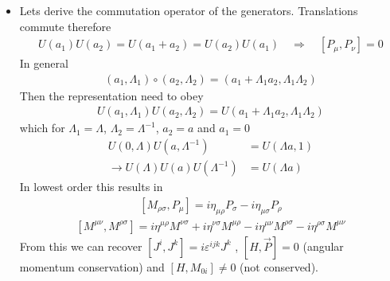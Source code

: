 \documentclass[10pt,a4paper]{article}
\theoremstyle{definition}
\begin{document}
\begin{itemize}
\item Lets derive the commutation operator of the generators. Translations commute therefore
\begin{align}
U(a_1)U(a_2)=U(a_1+a_2)=U(a_2)U(a_1)\quad\Rightarrow\quad
\boxed{[P_\mu,P_\nu]=0}
\end{align}
In general
\begin{align}
(a_1,\Lambda_1)\circ(a_2,\Lambda_2)=(a_1+\Lambda_1a_2,\Lambda_1\Lambda_2)
\end{align}
Then the representation need to obey
\begin{align}
U(a_1,\Lambda_1)U(a_2,\Lambda_2)=U(a_1+\Lambda_1a_2,\Lambda_1\Lambda_2)
\end{align}
which for $\Lambda_1=\Lambda$, $\Lambda_2=\Lambda^{-1}$, $a_2=a$ and $a_1=0$
\begin{align}
U(0,\Lambda)U(a,\Lambda^{-1})&=U(\Lambda a,1)\\
\rightarrow U(\Lambda)U(a)U(\Lambda^{-1})&=U(\Lambda a)
\end{align}
In lowest order this results in
\begin{align}
\boxed{[M_{\rho\sigma},P_\mu]=i\eta_{\mu\rho}P_\sigma-i\eta_{\mu\sigma}P_\rho }
\end{align}
\begin{align}
\boxed{[M^{\mu\nu},M^{\rho\sigma}]=i\eta^{\mu\rho}M^{\nu\sigma}+i\eta^{\nu\sigma}M^{\mu\rho}-i\eta^{\mu\nu}M^{\rho\sigma}-i\eta^{\rho\sigma}M^{\mu\nu}}
\end{align}
From this we can recover $[J^i,J^k]=i\varepsilon^{ijk}J^k$ , $[H,\vec{P}]=0$ (angular momentum conservation) and $[H,M_{0i}]\neq0$ (not conserved).
\end{itemize}
\end{document}
